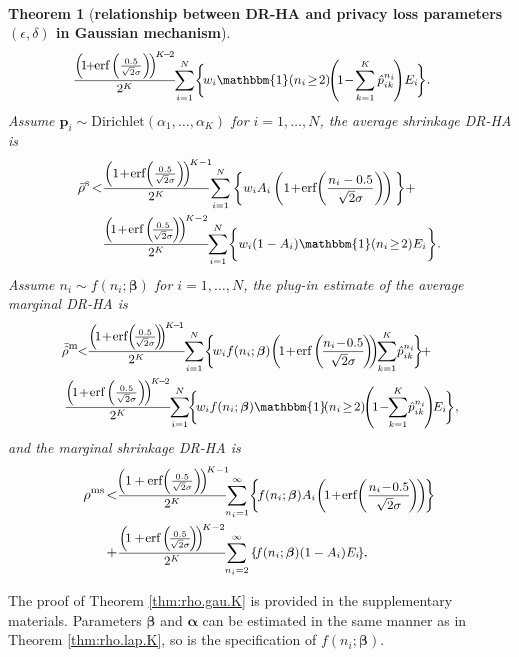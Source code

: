 \documentclass[10pt,journal,compsoc]{IEEEtran}
\newtheorem{thm}{\vspace{-6pt}\\ Theorem}
\newcommand{\p}{\mathbf{p}}
\newcommand{\bs}{\boldsymbol}
\begin{document}
\begin{thm}[\textbf{relationship between DR-HA and privacy loss parameters $(\epsilon,\delta)$ in Gaussian mechanism}]
\begin{align}
\!&\mbox{\small$\displaystyle\frac{\left(\!1\!\!+\!\!\mbox{erf}\left(\frac{0.5}{\sqrt{2}\sigma}\right)\!\right)^{\!K\!-\!2}}{2^K}\!\!\sum_{i=1}^N\!\bigg\{\!w_i\mathbbm{1}(n_i\!\ge\!2)\!\!\left(\!1\!-\!\sum_{k=1}^{K}\hat{p}_{ik}^{n_i}\!\right)\!E_i\!\bigg\}$}.\label{eqn:averagee.Gau.K}
\end{align}
Assume $\p_i\sim\mbox{Dirichlet}(\alpha_{1},\ldots,\alpha_{K})$ for $i=1,\ldots,N$, the average shrinkage DR-HA is
\begin{align}
\bar\rho^{\text{s}}\!<&\mbox{\small$\displaystyle\frac{\left(1\!+\!\mbox{erf}\!\left(\frac{0.5}{\sqrt{2}\sigma}\right)\!\right)^{\!K-1\!}\!}{2^{K}}\!\sum_{i=1}^{N}\bigg\{w_iA_i\left(1\!+\!\mbox{erf}\!\left(\frac{n_i-0.5}{\sqrt{2}\sigma}\right)\!\right)\bigg\}+$}\notag \\
&\mbox{\small$\displaystyle\frac{\left(\!1\!+\!\mbox{erf}\left(\!\frac{0.5}{\sqrt{2}\sigma}\!\right)\!\right)^{\!K-2}}{2^{K}}\!\!\sum_{i=1}^{N}\!\bigg\{w_i(1-A_i)\mathbbm{1}(n_i\!\ge\!2)E_i\bigg\}$}.\label{eqn:averages.Gau.K}
\end{align} 
Assume $n_i\!\sim\! f(n_i;\bs\beta)$ for $i\!=\!1,\ldots,N$, the plug-in estimate of the average marginal DR-HA is
\begin{align} 
\!&\!\bar{\hat{\rho}}^{\text{m}}\!\!<\!\mbox{$\small\displaystyle
\!\frac{\left(\!1\!+\!\mbox{erf}\!\left(\!\frac{0.5}{\sqrt{2}\sigma}\!\right)\!\!\right)^{\!K\!-\!1}}{2^K}\!\!
\sum_{i=1}^N\!\bigg\{\!w_if(n_i;\bs\beta)\! \left(\!1\!+\!\mbox{erf}\left(\!\frac{n_i\!-\!0.5}{\sqrt{2}\sigma}\!\right)\!\!\right)\!\!\sum_{k=1}^{K}\!\hat{p}_{ik}^{n_i}\!\bigg\}\!+\!\notag$}\\
\!&\mbox{$\small\displaystyle\frac{\left(\!1\!+\!\mbox{erf}\left(\frac{0.5}{\sqrt{2}\sigma}\right)\!\right)^{\!K\!-\!2}}{2^K}\!\!
\sum_{i=1}^N\!\!\bigg\{\!w_if(n_i;\bs\beta)\mathbbm{1}\!(n_i\!\ge\!2)\!\!\left(\!1\!-\!\!\sum_{k=1}^{K}\!\hat{p}_{ik}^{n_i}\!\right)\!\!E_i\!\bigg\}$},\!\!\!\label{eqn:averagem.Gau.K}
\end{align}
and the marginal shrinkage DR-HA is
\begin{align}
\rho^{\text{ms}}\!<&\mbox{$\small\displaystyle\frac{\!\left(1+\mbox{erf}\!\left(\frac{0.5}{\sqrt{2}\sigma}\right)\!\right)^{\!K-1\!}\!}{2^{K}}\!\!\sum_{n_i=1}^{\infty}\!\bigg\{\!f(n_i;\bs\beta)A_i\!\left(\!1\!+\!\mbox{erf}\!\left(\frac{n_i\!-\!0.5}{\sqrt{2}\sigma}\!\right)\!\right)\!\!\bigg\}$}\notag\\
+&\mbox{$\small\displaystyle\frac{\left(\!1+\!\mbox{erf}\left(\!\frac{0.5}{\sqrt{2}\sigma}\!\right)\!\right)^{\!K-2}}{2^{K}} \!\!\sum_{n_i=2}^{\infty}\left\{\!f(n_i;\bs\beta)(1-A_i)E_i\!\right\}$}.\!\!\label{eqn:averagems.gau}.
\end{align}
\end{thm}
The proof of Theorem \ref{thm:rho.gau.K}  is provided in the supplementary materials.  Parameters $\bs\beta$ and $\bs\alpha$ can be estimated in the same manner as in Theorem \ref{thm:rho.lap.K}, so is the specification of  $f(n_i;\bs\beta)$. 
\end{document}
